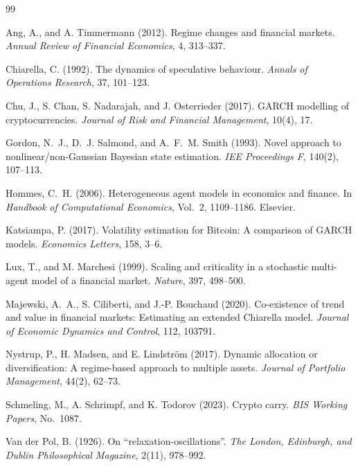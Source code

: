 \documentclass[11pt,a4paper]{article}
\begin{document}
\begin{thebibliography}{99}

Ang, A., and A. Timmermann (2012).
Regime changes and financial markets.
\emph{Annual Review of Financial Economics}, 4, 313--337.

Chiarella, C. (1992).
The dynamics of speculative behaviour.
\emph{Annals of Operations Research}, 37, 101--123.

Chu, J., S. Chan, S. Nadarajah, and J. Osterrieder (2017).
GARCH modelling of cryptocurrencies.
\emph{Journal of Risk and Financial Management}, 10(4), 17.

Gordon, N.~J., D.~J. Salmond, and A.~F.~M. Smith (1993).
Novel approach to nonlinear/non-Gaussian Bayesian state estimation.
\emph{IEE Proceedings F}, 140(2), 107--113.

Hommes, C.~H. (2006).
Heterogeneous agent models in economics and finance.
In \emph{Handbook of Computational Economics}, Vol.~2, 1109--1186. Elsevier.

Katsiampa, P. (2017).
Volatility estimation for Bitcoin: A comparison of GARCH models.
\emph{Economics Letters}, 158, 3--6.

Lux, T., and M. Marchesi (1999).
Scaling and criticality in a stochastic multi-agent model of a financial market.
\emph{Nature}, 397, 498--500.

Majewski, A.~A., S. Ciliberti, and J.-P. Bouchaud (2020).
Co-existence of trend and value in financial markets: Estimating an extended Chiarella model.
\emph{Journal of Economic Dynamics and Control}, 112, 103791.

Nystrup, P., H. Madsen, and E. Lindstr\"om (2017).
Dynamic allocation or diversification: A regime-based approach to multiple assets.
\emph{Journal of Portfolio Management}, 44(2), 62--73.

Schmeling, M., A. Schrimpf, and K. Todorov (2023).
Crypto carry.
\emph{BIS Working Papers}, No.~1087.

Van der Pol, B. (1926).
On ``relaxation-oscillations''.
\emph{The London, Edinburgh, and Dublin Philosophical Magazine}, 2(11), 978--992.

\end{thebibliography}
\end{document}
